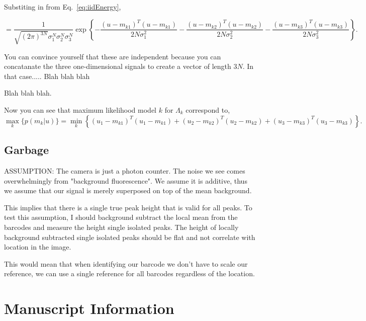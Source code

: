 Substiting in from Eq.~\ref{eq:iidEnergy},

\begin{equation}
= \frac{1}{  \sqrt{ (2\pi)^{3N}} \sigma_1^N\sigma_2^N\sigma_3^N  } \exp\left\{ -\frac{(u-m_{k1})^T(u-m_{k1})} {2 N \sigma_1^2 }   - \frac{(u-m_{k2})^T(u-m_{k2})} {2 N \sigma_2^2 } -\frac{(u-m_{k3})^T(u-m_{k3})} {2 N \sigma_3^2 }    \right\}.
\end{equation}

You can convince yourself that these are independent because you can concatanate the three one-dimensional signals to create a vector of length $3N$. In that case..... Blah blah blah


Blah blah blah.

Now you can see that maximum likelihood model $k$ for $\Lambda_k$ correspond to,
\begin{equation}
\max_k   \big\{ p(m_k|u) \big\} =  \min_k  \left\{ (u_1-m_{k1})^T(u_1-m_{k1}) +  (u_2-m_{k2})^T(u_2-m_{k2}) +(u_3-m_{k3})^T(u_3-m_{k3}) \right\}. 
\end{equation}










\subsection{Garbage	} 

ASSUMPTION: The camera is just a photon counter. The noise we see comes overwhelmingly from "background fluorescence". We assume it is additive, thus we assume that our signal is merely superposed on top of the mean background. 

This implies that there is a single true peak height that is valid for all peaks. To test this assumption, I should background subtract the local mean from the barcodes and measure the height single isolated peaks. The height of locally background subtracted single isolated peaks should be flat and not correlate with location in the image.

This would mean that when identifying our barcode we don't have to scale our reference, we can use a single reference for all barcodes regardless of the location.


\section{Manuscript Information}
